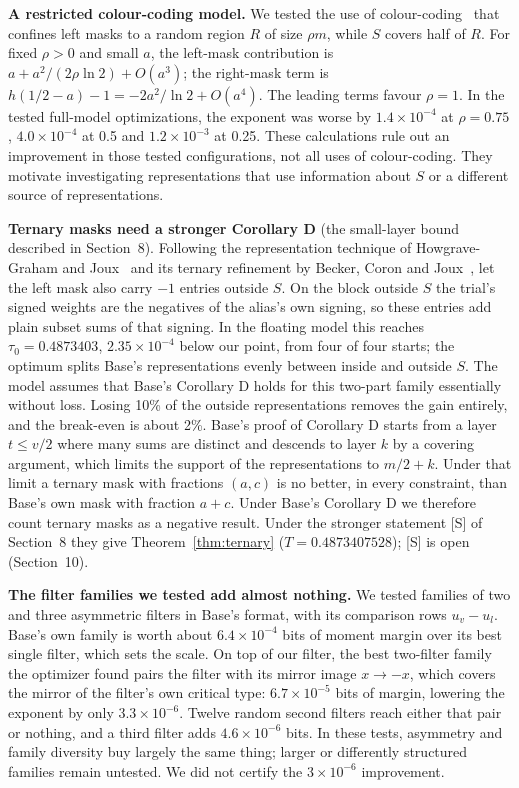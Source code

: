 \documentclass[11pt]{article}
\theoremstyle{plain}
\begin{document}
\textbf{A restricted colour-coding model.} We tested the use of colour-coding~\cite{ayz} that confines left masks to a random region $R$ of size $\rho m$, while $S$ covers half of $R$. For fixed $\rho>0$ and small $a$, the left-mask contribution is $a+a^2/(2\rho\ln2)+O(a^3)$; the right-mask term is $h(1/2-a)-1=-2a^2/\ln2+O(a^4)$. The leading terms favour $\rho=1$. In the tested full-model optimizations, the exponent was worse by $1.4\times10^{-4}$ at $\rho=0.75$, $4.0\times10^{-4}$ at 0.5 and $1.2\times10^{-3}$ at 0.25. These calculations rule out an improvement in those tested configurations, not all uses of colour-coding. They motivate investigating representations that use information about $S$ or a different source of representations.

\textbf{Ternary masks need a stronger Corollary D} (the small-layer bound described in Section~8). Following the representation technique of Howgrave-Graham and Joux~\cite{hgj} and its ternary refinement by Becker, Coron and Joux~\cite{bcj}, let the left mask also carry $-1$ entries outside $S$. On the block outside $S$ the trial's signed weights are the negatives of the alias's own signing, so these entries add plain subset sums of that signing. In the floating model this reaches $\tau_0 = 0.4873403$, $2.35\times10^{-4}$ below our point, from four of four starts; the optimum splits Base's representations evenly between inside and outside $S$. The model assumes that Base's Corollary D holds for this two-part family essentially without loss. Losing 10\% of the outside representations removes the gain entirely, and the break-even is about 2\%. Base's proof of Corollary D starts from a layer $t \le v/2$ where many sums are distinct and descends to layer $k$ by a covering argument, which limits the support of the representations to $m/2 + k$. Under that limit a ternary mask with fractions $(a, c)$ is no better, in every constraint, than Base's own mask with fraction $a + c$. Under Base's Corollary D we therefore count ternary masks as a negative result. Under the stronger statement [S] of Section~8 they give Theorem~\ref{thm:ternary} ($T = 0.4873407528$); [S] is open (Section~10).

\textbf{The filter families we tested add almost nothing.} We tested families of two and three asymmetric filters in Base's format, with its comparison rows $u_v - u_l$. Base's own family is worth about $6.4\times10^{-4}$ bits of moment margin over its best single filter, which sets the scale. On top of our filter, the best two-filter family the optimizer found pairs the filter with its mirror image $x \to -x$, which covers the mirror of the filter's own critical type: $6.7\times10^{-5}$ bits of margin, lowering the exponent by only $3.3\times10^{-6}$. Twelve random second filters reach either that pair or nothing, and a third filter adds $4.6\times10^{-6}$ bits. In these tests, asymmetry and family diversity buy largely the same thing; larger or differently structured families remain untested. We did not certify the $3\times10^{-6}$ improvement.
\end{document}
